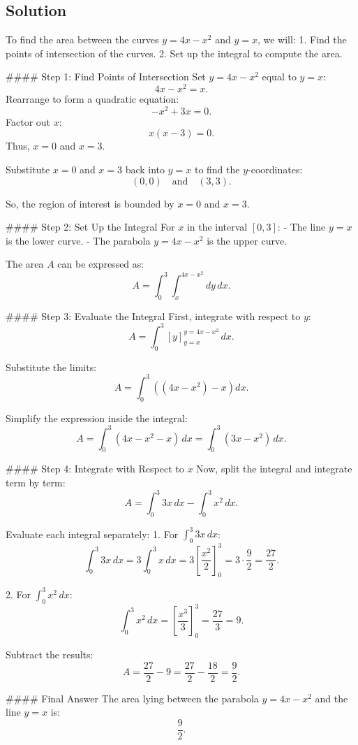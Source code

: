 \documentclass{article}
\begin{document}
\subsection*{Solution}
To find the area between the curves \( y = 4x - x^2 \) and \( y = x \), we will:
1. Find the points of intersection of the curves.
2. Set up the integral to compute the area.

#### Step 1: Find Points of Intersection
Set \( y = 4x - x^2 \) equal to \( y = x \):
\[
4x - x^2 = x.
\]
Rearrange to form a quadratic equation:
\[
-x^2 + 3x = 0.
\]
Factor out \( x \):
\[
x(x - 3) = 0.
\]
Thus, \( x = 0 \) and \( x = 3 \).

Substitute \( x = 0 \) and \( x = 3 \) back into \( y = x \) to find the \( y \)-coordinates:
\[
(0, 0) \quad \text{and} \quad (3, 3).
\]

So, the region of interest is bounded by \( x = 0 \) and \( x = 3 \).

#### Step 2: Set Up the Integral
For \( x \) in the interval \( [0, 3] \):
- The line \( y = x \) is the lower curve.
- The parabola \( y = 4x - x^2 \) is the upper curve.

The area \( A \) can be expressed as:
\[
A = \int_{0}^{3} \int_{x}^{4x - x^2} dy \, dx.
\]

#### Step 3: Evaluate the Integral
First, integrate with respect to \( y \):
\[
A = \int_{0}^{3} \left[ y \right]_{y=x}^{y=4x - x^2} \, dx.
\]

Substitute the limits:
\[
A = \int_{0}^{3} \left( (4x - x^2) - x \right) dx.
\]

Simplify the expression inside the integral:
\[
A = \int_{0}^{3} (4x - x^2 - x) \, dx = \int_{0}^{3} (3x - x^2) \, dx.
\]

#### Step 4: Integrate with Respect to \( x \)
Now, split the integral and integrate term by term:
\[
A = \int_{0}^{3} 3x \, dx - \int_{0}^{3} x^2 \, dx.
\]

Evaluate each integral separately:
1. For \( \int_{0}^{3} 3x \, dx \):
   \[
   \int_{0}^{3} 3x \, dx = 3 \int_{0}^{3} x \, dx = 3 \left[ \frac{x^2}{2} \right]_{0}^{3} = 3 \cdot \frac{9}{2} = \frac{27}{2}.
   \]

2. For \( \int_{0}^{3} x^2 \, dx \):
   \[
   \int_{0}^{3} x^2 \, dx = \left[ \frac{x^3}{3} \right]_{0}^{3} = \frac{27}{3} = 9.
   \]

Subtract the results:
\[
A = \frac{27}{2} - 9 = \frac{27}{2} - \frac{18}{2} = \frac{9}{2}.
\]

#### Final Answer
The area lying between the parabola \( y = 4x - x^2 \) and the line \( y = x \) is:
\[
\boxed{\frac{9}{2}}.
\]
\end{document}
